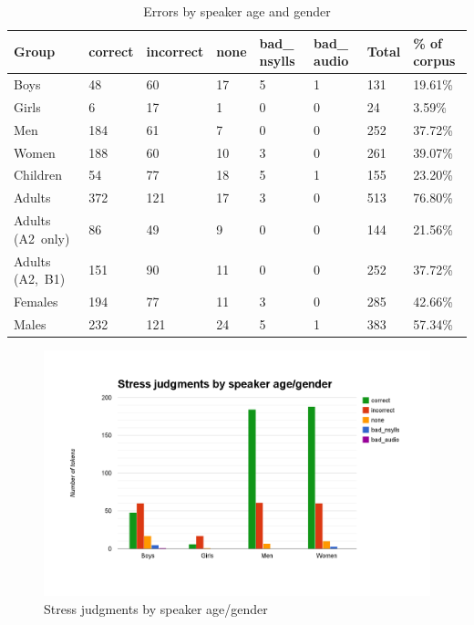 			\begin{table}[h]
				\caption[Errors by speaker age and gender]{Errors by speaker age and gender }
				\begin{tabularx}{\textwidth}{XXXXXXXX}			
				\toprule
Group	&	correct	&	incorrect	&	none	&	bad\_ nsylls	&	bad\_ audio	&	Total	&	\% of corpus	\\
				\midrule
Boys	&	48	&	60	&	17	&	5	&	1	&	131	&	19.61\%	\\
Girls	&	6	&	17	&	1	&	0	&	0	&	24	&	3.59\%	\\
Men	&	184	&	61	&	7	&	0	&	0	&	252	&	37.72\%	\\
Women	&	188	&	60	&	10	&	3	&	0	&	261	&	39.07\%	\\

\midrule		
Children	&	54	&	77	&	18	&	5	&	1	&	155	&	23.20\%	\\													
Adults	&	372	&	121	&	17	&	3	&	0	&	513	&	76.80\%	\\
Adults (A2~only) & 86 & 49 & 9 & 0 & 0 & 144 & 21.56\%\\
Adults (A2,~B1) &  151 & 90 & 11 & 0 & 0 & 252 & 37.72\%\\

\midrule															
Females	&	194	&	77	&	11	&	3	&	0	&	285	&	42.66\%	\\
Males	&	232	&	121	&	24	&	5	&	1	&	383	&	57.34\%	\\
				\bottomrule	
				\end{tabularx}
				\label{tab:results:agegender}
			\end{table}
			
			
			\begin{figure}[htb]
				\centering
				\includegraphics[width=\textwidth]{img/annotation/ageGenderBars}
				\caption{Stress judgments by speaker age/gender}
				\label{fig:results:agegenderbars}
			\end{figure}
			
